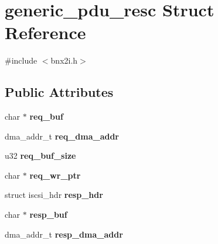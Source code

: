 \hypertarget{structgeneric__pdu__resc}{
\section{generic\_\-pdu\_\-resc Struct Reference}
\label{structgeneric__pdu__resc}
}


{\ttfamily \#include $<$bnx2i.h$>$}

\subsection*{Public Attributes}
\begin{DoxyCompactItemize}
\item 
\hypertarget{structgeneric__pdu__resc_aab8f220bba88805ea04caf915bf9eb51}{
char $\ast$ {\bfseries req\_\-buf}}
\label{structgeneric__pdu__resc_aab8f220bba88805ea04caf915bf9eb51}

\item 
\hypertarget{structgeneric__pdu__resc_a359217fab0b548c5f4d0f8c844b89e14}{
dma\_\-addr\_\-t {\bfseries req\_\-dma\_\-addr}}
\label{structgeneric__pdu__resc_a359217fab0b548c5f4d0f8c844b89e14}

\item 
\hypertarget{structgeneric__pdu__resc_ab11842051fe1f1cd685930abeedb5a51}{
u32 {\bfseries req\_\-buf\_\-size}}
\label{structgeneric__pdu__resc_ab11842051fe1f1cd685930abeedb5a51}

\item 
\hypertarget{structgeneric__pdu__resc_a285107d60e3f75715b53d6680699fec3}{
char $\ast$ {\bfseries req\_\-wr\_\-ptr}}
\label{structgeneric__pdu__resc_a285107d60e3f75715b53d6680699fec3}

\item 
\hypertarget{structgeneric__pdu__resc_a6ff2c39a6ef8db8c6c080122d3900b34}{
struct iscsi\_\-hdr {\bfseries resp\_\-hdr}}
\label{structgeneric__pdu__resc_a6ff2c39a6ef8db8c6c080122d3900b34}

\item 
\hypertarget{structgeneric__pdu__resc_a5caab87e2046cf41420564cdca7466b1}{
char $\ast$ {\bfseries resp\_\-buf}}
\label{structgeneric__pdu__resc_a5caab87e2046cf41420564cdca7466b1}

\item 
\hypertarget{structgeneric__pdu__resc_ae9dba6add93f6cbc759788ed558879d5}{
dma\_\-addr\_\-t {\bfseries resp\_\-dma\_\-addr}}
\label{structgeneric__pdu__resc_ae9dba6add93f6cbc759788ed558879d5}


\end{DoxyCompactItemize}
